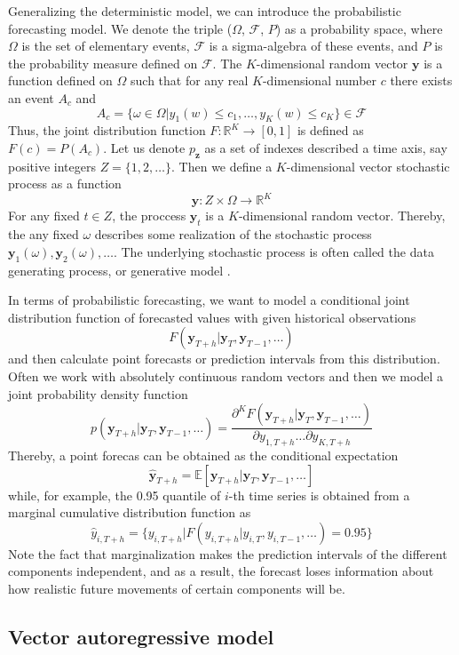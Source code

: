 \documentclass[12pt,a4paper]{article}
\begin{document}
Generalizing the deterministic model, we can introduce the probabilistic forecasting model. We denote the triple ($\Omega$, $\mathcal F$, $P$) as a probability space, where $\Omega$ is the set of elementary events, $\mathcal F$ is a sigma-algebra of these events, and $P$ is the probability measure defined on $\mathcal F$. The $K$-dimensional random vector $\mathbf y$ is a function defined on $\Omega$ such that for any real $K$-dimensional number $c$ there exists an event $A_c$ and
$$A_c = \{ \omega \in \Omega | y_1(w)\leq c_1, \dots, y_K(w) \leq c_K\} \in \mathcal F$$
Thus, the joint distribution function $F: \mathbb R^K \to[0, 1]$ is defined as $F(c)=P(A_c)$. Let us denote $p_\mathbf z$ as a set of indexes described a time axis, say positive integers $Z = \{1, 2, \dots\}$. Then we define a $K$-dimensional vector stochastic process as a function 
$$\mathbf y: Z \times \Omega \to \mathbb R^K$$
For any fixed $t \in Z$, the proccess $\mathbf y_t$ is a $K$-dimensional random vector. Thereby, the any fixed $\omega$ describes some realization of the stochastic process $\mathbf y_1(\omega), \mathbf y_2(\omega), \dots$. The underlying stochastic process is often called the data generating process, or generative model \cite{mts2007}.

In terms of probabilistic forecasting, we want to model a conditional joint distribution function of forecasted values with given historical observations
$$F(\mathbf y_{T+h} | \mathbf y_{T}, \mathbf y_{T-1}, \dots)$$
and then calculate point forecasts or prediction intervals from this distribution. Often we work with absolutely continuous random vectors and then we model a joint probability density function
$$p(\mathbf y_{T+h} | \mathbf y_{T}, \mathbf y_{T-1}, \dots) = \frac{\partial^K F(\mathbf y_{T+h} | \mathbf y_{T}, \mathbf y_{T-1}, \dots)}{\partial y_{1, T+h}\dots\partial y_{K, T+h}}$$
Thereby, a point forecas can be obtained as the conditional expectation
$$\hat{\mathbf y}_{T+h} = \mathbb E[\mathbf y_{T+h} | \mathbf y_{T}, \mathbf y_{T-1}, \dots]$$
while, for example, the 0.95 quantile of $i$-th time series is obtained from a marginal cumulative distribution function as
$$\hat{y}_{i, T+h} = \{ y_{i, T+h} | F(y_{i, T+h} | y_{i, T}, y_{i, T-1}, \dots) = 0.95 \}$$
Note the fact that marginalization makes the prediction intervals of the different components independent, and as a result, the forecast loses information about how realistic future movements of certain components will be.

\subsection{Vector autoregressive model}
\end{document}

